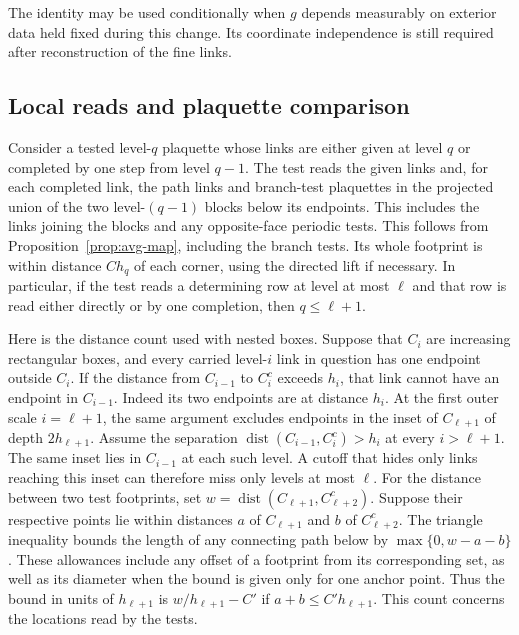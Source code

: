 \documentclass[11pt,letterpaper,reqno]{amsart}
\numberwithin{equation}{section}
\theoremstyle{definition}
\theoremstyle{remark}
\begin{document}
The identity may be used conditionally when \(g\) depends measurably
on exterior data held fixed during this change. Its coordinate
independence is still required after reconstruction of the fine links.

\subsection{Local reads and plaquette comparison}
\label{sec:guarded-plaquettes}

Consider a tested level-\(q\) plaquette whose links are either
given at level \(q\) or completed by one step from level \(q-1\).
The test reads the given links and, for each completed link,
the path links and branch-test plaquettes in the projected union
of the two level-\((q-1)\) blocks below its endpoints. This includes
the links joining the blocks and any opposite-face periodic tests.
This follows from Proposition~\ref{prop:avg-map}, including
the branch tests. Its whole footprint is within distance
\(C h_q\) of each corner, using the directed lift if necessary.
In particular, if the test reads a determining row at level
at most \(\ell\) and that row is read either directly or by one
completion, then \(q\leq\ell+1\).

Here is the distance count used with nested boxes. Suppose that
\(C_i\) are increasing rectangular boxes, and every carried
level-\(i\) link in question has one endpoint outside \(C_i\).
If the distance from \(C_{i-1}\) to \(C_i^c\) exceeds \(h_i\),
that link cannot have an endpoint in \(C_{i-1}\).
Indeed its two endpoints are at distance \(h_i\).
At the first outer scale \(i=\ell+1\), the same argument excludes
endpoints in the inset of \(C_{\ell+1}\) of depth \(2h_{\ell+1}\).
Assume the separation \(\operatorname{dist}(C_{i-1},C_i^c)>h_i\)
at every \(i>\ell+1\). The same inset lies in \(C_{i-1}\) at each
such level. A cutoff that hides only links reaching this inset can
therefore miss only levels at most \(\ell\).
For the distance between two test footprints, set
\(w=\operatorname{dist}(C_{\ell+1},C_{\ell+2}^c)\).
Suppose their respective points lie within distances \(a\) of
\(C_{\ell+1}\) and \(b\) of \(C_{\ell+2}^c\). The triangle
inequality bounds the length of any connecting path below by
\(\max\{0,w-a-b\}\). These allowances include any offset of a
footprint from its corresponding set, as well as its diameter
when the bound is given only for one anchor point. Thus the bound
in units of \(h_{\ell+1}\) is \(w/h_{\ell+1}-C'\) if
\(a+b\le C'h_{\ell+1}\). This count concerns the locations read
by the tests.
\end{document}
